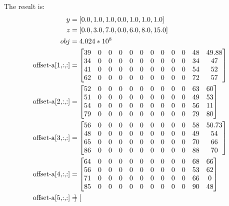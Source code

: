 \documentclass[fleqn,10pt]{wlscirep}
\begin{document}
The result is:
\begin{align}
    y &= [0.0, 1.0, 1.0, 0.0, 1.0, 1.0, 1.0] \\
    z &= [0.0, 3.0, 7.0, 0.0, 6.0, 8.0, 15.0] \\
    obj &= 4.024 * 10^8 \\
    \text{offset-a[1,:,:]} &= {
    \setcounter{MaxMatrixCols}{20}
    \begin{bmatrix}
    39 &0 &0 &0 &0 &0 &0 &0 &0 &0 &48 &49.88 \\ 
    34 &0 &0 &0 &0 &0 &0 &0 &0 &0 &34 &47 \\ 
    41 &0 &0 &0 &0 &0 &0 &0 &0 &0 &54 &52 \\
    62 &0 &0 &0 &0 &0 &0 &0 &0 &0 &72 &57
    \end{bmatrix}
    }%
    \\ 
    \text{offset-a[2,:,:]} &= {
    \setcounter{MaxMatrixCols}{20}
    \begin{bmatrix}
    52 &0 &0 &0 &0 &0 &0 &0 &0 &0 &63 &60 \\ 
    51 &0 &0 &0 &0 &0 &0 &0 &0 &0 &49 &53 \\
    54 &0 &0 &0 &0 &0 &0 &0 &0 &0 &56 &11 \\ 
    79 &0 &0 &0 &0 &0 &0 &0 &0 &0 &79 &80
    \end{bmatrix}
    }%
    \\ 
    \text{offset-a[3,:,:]} &= {
    \setcounter{MaxMatrixCols}{20}
    \begin{bmatrix}
    56 &0 &0 &0 &0 &0 &0 &0 &0 &0 &58 &50.73 \\
    48 &0 &0 &0 &0 &0 &0 &0 &0 &0 &49 &54 \\ 
    65 &0 &0 &0 &0 &0 &0 &0 &0 &0 &70 &66 \\ 
    86 &0 &0 &0 &0 &0 &0 &0 &0 &0 &88 &70
    \end{bmatrix}
    }%
    \\ 
    \text{offset-a[4,:,:]} &= {
    \setcounter{MaxMatrixCols}{20}
    \begin{bmatrix}
    64 &0 &0 &0 &0 &0 &0 &0 &0 &0 &68 &66 \\ 
    56 &0 &0 &0 &0 &0 &0 &0 &0 &0 &53 &62 \\ 
    71 &0 &0 &0 &0 &0 &0 &0 &0 &0 &66 &0 \\ 
    85 &0 &0 &0 &0 &0 &0 &0 &0 &0 &90 &48
    \end{bmatrix}
    }%
    \\ 
    \text{offset-a[5,:,:]} &= {
    \setcounter{MaxMatrixCols}{20}
    \begin{bmatrix}

\end{bmatrix}}
\end{align}
\end{document}
